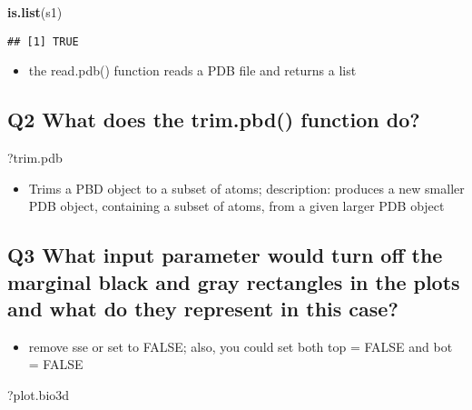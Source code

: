 \documentclass[]{article}
\newenvironment{Shaded}{\begin{snugshade}}{\end{snugshade}}
\newcommand{\KeywordTok}[1]{\textcolor[rgb]{0.13,0.29,0.53}{\textbf{#1}}}
\newcommand{\NormalTok}[1]{#1}
\providecommand{\tightlist}{%
  \setlength{\itemsep}{0pt}\setlength{\parskip}{0pt}}
\begin{document}
\begin{Shaded}
\begin{Highlighting}[]
\KeywordTok{is.list}\NormalTok{(s1)}
\end{Highlighting}
\end{Shaded}

\begin{verbatim}
## [1] TRUE
\end{verbatim}

\begin{itemize}
\tightlist
\item
  the read.pdb() function reads a PDB file and returns a list
\end{itemize}

\subsection{Q2 What does the trim.pbd() function
do?}\label{q2-what-does-the-trim.pbd-function-do}

\begin{Shaded}
\begin{Highlighting}[]
\NormalTok{?trim.pdb}
\end{Highlighting}
\end{Shaded}

\begin{itemize}
\tightlist
\item
  Trims a PBD object to a subset of atoms; description: produces a new
  smaller PDB object, containing a subset of atoms, from a given larger
  PDB object
\end{itemize}

\subsection{Q3 What input parameter would turn off the marginal black
and gray rectangles in the plots and what do they represent in this
case?}\label{q3-what-input-parameter-would-turn-off-the-marginal-black-and-gray-rectangles-in-the-plots-and-what-do-they-represent-in-this-case}

\begin{itemize}
\tightlist
\item
  remove sse or set to FALSE; also, you could set both top = FALSE and
  bot = FALSE
\end{itemize}

\begin{Shaded}
\begin{Highlighting}[]
\NormalTok{?plot.bio3d}
\end{Highlighting}
\end{Shaded}
\end{document}
